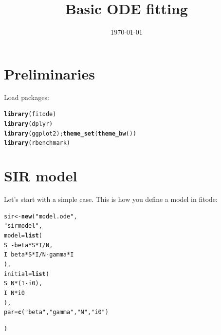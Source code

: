 \documentclass{article}\usepackage[]{graphicx}\usepackage[]{color}
\title{Basic ODE fitting}
\date{\today}
\makeatletter
\newcommand{\hlnum}[1]{\textcolor[rgb]{0.686,0.059,0.569}{#1}}%
\newcommand{\hlstr}[1]{\textcolor[rgb]{0.192,0.494,0.8}{#1}}%
\newcommand{\hlopt}[1]{\textcolor[rgb]{0,0,0}{#1}}%
\newcommand{\hlstd}[1]{\textcolor[rgb]{0.345,0.345,0.345}{#1}}%
\newcommand{\hlkwb}[1]{\textcolor[rgb]{0.69,0.353,0.396}{#1}}%
\newcommand{\hlkwc}[1]{\textcolor[rgb]{0.333,0.667,0.333}{#1}}%
\newcommand{\hlkwd}[1]{\textcolor[rgb]{0.737,0.353,0.396}{\textbf{#1}}}%
\newenvironment{kframe}{%
 \def\at@end@of@kframe{}%
 \ifinner\ifhmode%
  \def\at@end@of@kframe{\end{minipage}}%
  \begin{minipage}{\columnwidth}%
 \fi\fi%
 \def\FrameCommand##1{\hskip\@totalleftmargin \hskip-\fboxsep
 \colorbox{shadecolor}{##1}\hskip-\fboxsep
     \hskip-\linewidth \hskip-\@totalleftmargin \hskip\columnwidth}%
 \MakeFramed {\advance\hsize-\width
   \@totalleftmargin\z@ \linewidth\hsize
   \@setminipage}}%
 {\par\unskip\endMakeFramed%
 \at@end@of@kframe}
\newenvironment{knitrout}{}{} %
\makeatother
\begin{document}
\maketitle



\section{Preliminaries}

Load packages:

\begin{knitrout}
\color{fgcolor}\begin{kframe}
\begin{alltt}
\hlkwd{library}\hlstd{(fitode)}
\hlkwd{library}\hlstd{(dplyr)}
\hlkwd{library}\hlstd{(ggplot2);} \hlkwd{theme_set}\hlstd{(}\hlkwd{theme_bw}\hlstd{())}
\hlkwd{library}\hlstd{(rbenchmark)}
\end{alltt}
\end{kframe}
\end{knitrout}

\section{SIR model}

Let's start with a simple case. This is how you define a model in fitode:

\begin{knitrout}
\color{fgcolor}\begin{kframe}
\begin{alltt}
\hlstd{sir} \hlkwb{<-} \hlkwd{new}\hlstd{(}\hlstr{"model.ode"}\hlstd{,}
    \hlstr{"sir model"}\hlstd{,}
    \hlkwc{model}\hlstd{=}\hlkwd{list}\hlstd{(}
        \hlstd{S} \hlopt{~ -}\hlstd{beta}\hlopt{*}\hlstd{S}\hlopt{*}\hlstd{I}\hlopt{/}\hlstd{N,}
        \hlstd{I} \hlopt{~} \hlstd{beta}\hlopt{*}\hlstd{S}\hlopt{*}\hlstd{I}\hlopt{/}\hlstd{N} \hlopt{-} \hlstd{gamma}\hlopt{*}\hlstd{I}
    \hlstd{),}
    \hlkwc{initial}\hlstd{=}\hlkwd{list}\hlstd{(}
        \hlstd{S} \hlopt{~} \hlstd{N}\hlopt{*}\hlstd{(}\hlnum{1}\hlopt{-}\hlstd{i0),}
        \hlstd{I} \hlopt{~} \hlstd{N}\hlopt{*}\hlstd{i0}
    \hlstd{),}
    \hlkwc{par}\hlstd{=}\hlkwd{c}\hlstd{(}\hlstr{"beta"}\hlstd{,} \hlstr{"gamma"}\hlstd{,} \hlstr{"N"}\hlstd{,} \hlstr{"i0"}\hlstd{)}

\hlstd{)}
\end{alltt}
\end{kframe}
\end{knitrout}
\end{document}
